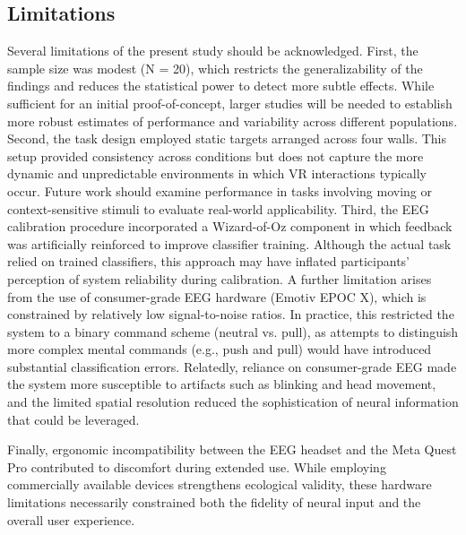 \documentclass[utf8]{FrontiersinHarvard} %
\begin{document}
\subsection{Limitations}
Several limitations of the present study should be acknowledged. First, the sample size was modest (N = 20), which restricts the generalizability of the findings and reduces the statistical power to detect more subtle effects. While sufficient for an initial proof-of-concept, larger studies will be needed to establish more robust estimates of performance and variability across different populations.
Second, the task design employed static targets arranged across four walls. This setup provided consistency across conditions but does not capture the more dynamic and unpredictable environments in which VR interactions typically occur. Future work should examine performance in tasks involving moving or context-sensitive stimuli to evaluate real-world applicability.
Third, the EEG calibration procedure incorporated a Wizard-of-Oz component in which feedback was artificially reinforced to improve classifier training. Although the actual task relied on trained classifiers, this approach may have inflated participants' perception of system reliability during calibration.
A further limitation arises from the use of consumer-grade EEG hardware (Emotiv EPOC X), which is constrained by relatively low signal-to-noise ratios. In practice, this restricted the system to a binary command scheme (neutral vs. pull), as attempts to distinguish more complex mental commands (e.g., push and pull) would have introduced substantial classification errors. Relatedly, reliance on consumer-grade EEG made the system more susceptible to artifacts such as blinking and head movement, and the limited spatial resolution reduced the sophistication of neural information that could be leveraged.

Finally, ergonomic incompatibility between the EEG headset and the Meta Quest Pro contributed to discomfort during extended use. While employing commercially available devices strengthens ecological validity, these hardware limitations necessarily constrained both the fidelity of neural input and the overall user experience.
\end{document}
